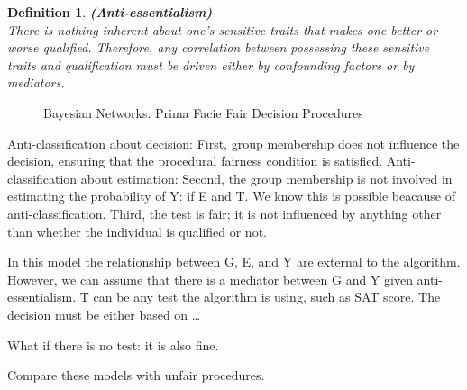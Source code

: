 \documentclass{article}
\newtheorem{definition}{Definition}
\begin{document}
\begin{definition}
\textup{\textbf{ (Anti-essentialism) } \\
There is nothing \textit{inherent} about one’s sensitive traits that makes one better or worse qualified. Therefore, any correlation between possessing these sensitive traits and qualification must be driven either by confounding factors or by mediators.}
\end{definition}





  \begin{figure}[h]
 \caption{Bayesian Networks. Prima Facie Fair Decision Procedures}
  \label{fig:fit}
    \label{fig:my_label}
\end{figure}


Anti-classification about decision: 
First, group membership does not influence the decision, ensuring that the procedural fairness condition is satisfied.
Anti-classification about estimation: 
Second, the group membership is not involved in estimating the probability of Y: if E and T. We know this is possible beacause of anti-classification. 
Third, the test is fair; it is not influenced by anything other than whether the individual is qualified or not. 

In this model the relationship between G, E, and Y are external to the algorithm. However, we can assume that there is a mediator between G and Y given anti-essentialism. T can be any test the algorithm is using, such as SAT score. The decision must be either based on \dots

What if there is no test: it is also fine. 

Compare these models with unfair procedures. 

\setlength{\bibleftmargin}{.125in}
\setlength{\bibindent}{-\bibleftmargin}


\end{document}
